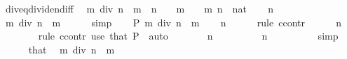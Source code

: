 \begin{isabellebody}
\isanewline
{}\isamarkupfalse%
%
\endisatagproof
{\isafoldproof}%
%
\isadelimproof
\isanewline
%
\endisadelimproof
\isanewline
{}\isamarkupfalse%
\ div{\isacharunderscore}{\kern0pt}eq{\isacharunderscore}{\kern0pt}dividend{\isacharunderscore}{\kern0pt}iff{\isacharcolon}{\kern0pt}\isanewline
\ \ {\isachardoublequoteopen}m\ div\ n\ {\isacharequal}{\kern0pt}\ m\ {\isasymlongleftrightarrow}\ n\ {\isacharequal}{\kern0pt}\ {}{\isachardoublequoteclose}\ \ {\isachardoublequoteopen}m\ {\isachargreater}{\kern0pt}\ {}{\isachardoublequoteclose}\ \ m\ n\ {\isacharcolon}{\kern0pt}{\isacharcolon}{\kern0pt}\ nat\isanewline
%
\isadelimproof
%
\endisadelimproof
%
\isatagproof
{}\isamarkupfalse%
\isanewline
\ \ \isamarkupfalse%
\ {\isachardoublequoteopen}n\ {\isacharequal}{\kern0pt}\ {}{\isachardoublequoteclose}\isanewline
\ \ \isamarkupfalse%
\ \isamarkupfalse%
\ {\isachardoublequoteopen}m\ div\ n\ {\isacharequal}{\kern0pt}\ m{\isachardoublequoteclose}\isanewline
\ \ \ \ \isamarkupfalse%
\ simp\isanewline
{}\isamarkupfalse%
\isanewline
\ \ \isamarkupfalse%
\ P{\isacharcolon}{\kern0pt}\ {\isachardoublequoteopen}m\ div\ n\ {\isacharequal}{\kern0pt}\ m{\isachardoublequoteclose}\isanewline
\ \ \isamarkupfalse%
\ {\isachardoublequoteopen}n\ {\isacharequal}{\kern0pt}\ {}{\isachardoublequoteclose}\isanewline
\ \ \isamarkupfalse%
\ {\isacharparenleft}{\kern0pt}rule\ ccontr{\isacharparenright}{\kern0pt}\isanewline
\ \ \ \ \isamarkupfalse%
\ {\isachardoublequoteopen}n\ {\isasymnoteq}\ {}{\isachardoublequoteclose}\isanewline
\ \ \ \ \ \ \isamarkupfalse%
\ {\isacharparenleft}{\kern0pt}rule\ ccontr{\isacharparenright}{\kern0pt}\ {\isacharparenleft}{\kern0pt}use\ that\ P\ \ auto{\isacharparenright}{\kern0pt}\isanewline
\ \ \ \ \isamarkupfalse%
\ \isamarkupfalse%
\ {\isachardoublequoteopen}n\ {\isasymnoteq}\ {}{\isachardoublequoteclose}\isanewline
\ \ \ \ \isamarkupfalse%
\ \isamarkupfalse%
\ {\isachardoublequoteopen}n\ {\isachargreater}{\kern0pt}\ {}{\isachardoublequoteclose}\isanewline
\ \ \ \ \ \ \isamarkupfalse%
\ simp\isanewline
\ \ \ \ \isamarkupfalse%
\ that\ \isamarkupfalse%
\ {\isachardoublequoteopen}m\ div\ n\ {\isacharless}{\kern0pt}\ m{\isachardoublequoteclose}\isanewline

\end{isabellebody}
